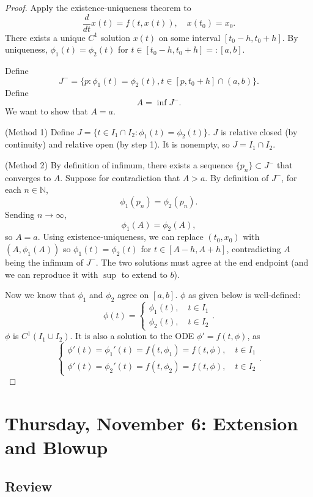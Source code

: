 \documentclass{tufte-handout}
\newcommand*\N{\mathbb{N}}
\theoremstyle{definition}
\begin{document}
\begin{proof}
	Apply the existence-uniqueness theorem to \[
		\frac{d}{dt}x(t) = f(t,x(t)), \quad x(t_0) = x_0
	.\] There exists a unique $C^1$ solution $x(t)$ on some interval $[t_0-h,t_0+h]$. By uniqueness, $\phi_1(t) = \phi_2(t)$ for $t \in [t_0-h,t_0+h] =: [a,b]$.

	Define \[
		J^- = \{p : \phi_1(t) = \phi_2(t), t \in [p,t_0+h] \cap (a,b) \}
	.\] Define \[
		A = \inf J^-
	.\]
	We want to show that $A = a$.

	(Method 1) Define $J = \{t \in I_1 \cap I_2 : \phi_1(t) = \phi_2(t)\}$. $J$ is relative closed (by continuity) and relative open (by step 1). It is nonempty, so $J = I_1 \cap  I_2$.

	(Method 2) By definition of infimum, there exists a sequence $\{p_n\} \subset J^-$ that converges to $A$. Suppose for contradiction that $A > a$. By definition of $J^-$, for each $n \in \N$, \[
		\phi_1(p_n) = \phi_2(p_n)
	.\] Sending $n \to \infty$, \[
		\phi_1(A) = \phi_2(A)
	,\] so $A = a$. 
	Using existence-uniqueness, we can replace $(t_0,x_0)$ with $(A, \phi_1(A))$ so $\phi_1(t) = \phi_2(t)$ for $t \in [A-h, A+h]$, contradicting $A$ being the infimum of $J^-$. The two solutions must agree at the end endpoint (and we can reproduce it with $\sup$ to extend to $b$).

	Now we know that $\phi_1$ and $\phi_2$ agree on $[a,b]$. $\phi$ as given below is well-defined: \[
		\phi(t) = \begin{cases}
			\phi_1(t), \quad t \in I_1 \\
			\phi_2(t),\quad t\in I_2
		\end{cases}
	.\] $\phi$ is $C^1 (I_1 \cup I_2)$. It is also a solution to the ODE $\phi' = f(t,\phi)$, as \[
		\begin{cases}
			\phi'(t) = \phi_1'(t) = f(t,\phi_1) = f(t,\phi), \quad t \in I_1 \\
			\phi'(t) = \phi_2'(t) = f(t,\phi_2) = f(t,\phi), \quad t \in I_2
		\end{cases}
	.\] 

\end{proof}

\section{Thursday, November 6: Extension and Blowup}

\subsection{Review}
\end{document}

